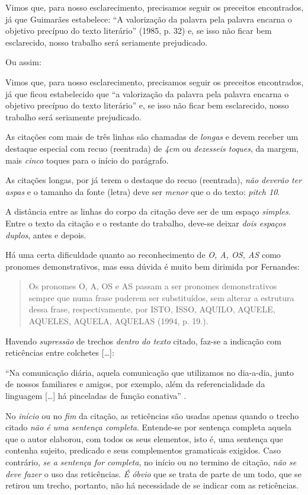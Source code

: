 Vimos que, para nosso esclarecimento, precisamos seguir os preceitos encontrados, já que Guimarães estabelece: ``A valorização da palavra pela palavra encarna o objetivo precípuo do texto literário'' (1985, p. 32) e, se isso não ficar bem esclarecido, nosso trabalho será seriamente prejudicado.

Ou assim:

Vimos que, para nosso esclarecimento, precisamos seguir os preceitos encontrados, já que ficou estabelecido que ``a valorização da palavra pela palavra encarna o objetivo precípuo do texto literário'' \cite[p. 32]{guimaraes1985} e, se isso não ficar bem esclarecido, nosso trabalho será seriamente prejudicado.

As citações com mais de três linhas são chamadas de \emph{longas} e devem receber um destaque especial com recuo (reentrada) de \emph{4cm} ou \emph{dezesseis toques}, da margem, mais \emph{cinco} toques para o início do parágrafo.

As citações longas, por já terem o destaque do recuo (reentrada), \emph{não deverão ter aspas} e o tamanho da fonte (letra) deve ser \emph{menor} que o do texto: \emph{pitch 10}.

A distância entre as linhas do corpo da citação deve ser de um espaço \emph{simples}. Entre o texto da citação e o restante do trabalho, deve-se deixar \emph{dois espaços duplos}, antes e depois.

Há uma certa dificuldade quanto ao reconhecimento de \emph{O, A, OS, AS} como pronomes demonstrativos, mas essa dúvida é muito bem dirimida por Fernandes:

\begin{quote}Os pronomes O, A, OS e AS passam a ser pronomes demonstrativos sempre que numa frase puderem ser substituídos, sem alterar a estrutura dessa frase, respectivamente, por ISTO, ISSO, AQUILO, AQUELE, AQUELES, AQUELA, AQUELAS (1994, p. 19.).\end{quote}

Havendo \emph{supressão} de trechos \emph{dentro do texto} citado, faz-se a indicação com reticências entre colchetes [\ldots]:

``Na comunicação diária, aquela comunicação que utilizamos no dia-a-dia, junto de nossos familiares e amigos, por exemplo, além da referencialidade da linguagem [\ldots] há pinceladas de função conativa'' \cite[p. 37]{chalhub1991}.

No \emph{início} ou no \emph{fim} da citação, as reticências são usadas apenas quando o trecho citado \emph{não é uma sentença completa}. Entende-se por sentença completa aquela que o autor elaborou, com todos os seus elementos, isto é, uma sentença que contenha sujeito, predicado e seus complementos gramaticais exigidos. Caso contrário, \emph{se a sentença for completa}, no início ou no termino de citação, \emph{não se deve fazer} o uso das reticências. \emph{É óbvio} que se trata de parte de um todo, que se retirou um trecho, portanto, não há necessidade de se indicar com as reticências.

